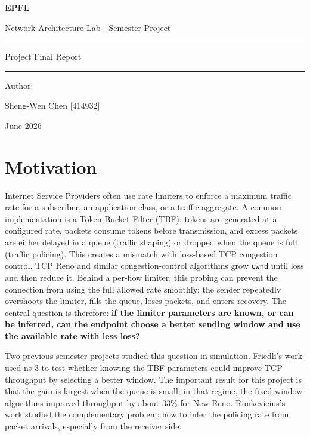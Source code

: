 \documentclass{article}
\newcommand{\code}[1]{\texttt{#1}}
\begin{document}
\thispagestyle{empty}
\begin{center}
\vspace*{1cm}
{\Huge \color{epflred}\bfseries EPFL}

\vspace{0.5cm}
{\large Network Architecture Lab - Semester Project}

\vspace{0.1cm}
\rule{6cm}{0.4pt}

\vspace{0.1cm}
Project Final Report

\rule{6cm}{0.4pt}

\vspace{0.5cm}
{\Large }

\vspace{1cm}

Author:

Sheng-Wen Chen [414932]

\vspace{0.5cm}
June 2026
\end{center}

\newpage

\tableofcontents

\newpage

\section{Motivation}

Internet Service Providers often use rate limiters to enforce a maximum traffic rate for a subscriber, an application 
class, or a traffic aggregate. A common implementation is a Token Bucket Filter (TBF): tokens are generated at a configured 
rate, packets consume tokens before transmission, and excess packets are either delayed in a queue (traffic shaping) or 
dropped when the queue is full (traffic policing). This creates a mismatch with 
loss-based TCP congestion control. TCP Reno and similar congestion-control algorithms grow 
\code{cwnd} until loss and then reduce it. Behind a per-flow limiter, this probing can prevent the connection from using 
the full allowed rate smoothly: the sender repeatedly overshoots the limiter, fills the queue, loses packets, and enters 
recovery. The central question is therefore: \textbf{if the limiter parameters are known, or can be inferred, can the endpoint 
choose a better sending window and use the available rate with less loss?}

Two previous semester projects studied this question in simulation. Friedli's work used ns-3 to test whether knowing the 
TBF parameters could improve TCP throughput by selecting a better window. The important result for this project is that 
the gain is largest when the queue is small; in that regime, the fixed-window algorithms improved throughput by about 
33\% for New Reno. Rimkevicius's work studied the complementary problem: how to infer the policing rate from packet 
arrivals, especially from the receiver side.
\end{document}

